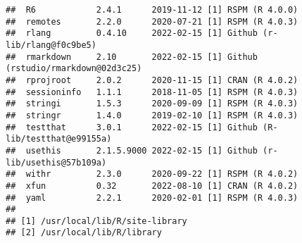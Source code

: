 \documentclass[
]{book}
\begin{document}
\begin{verbatim}
##  R6            2.4.1      2019-11-12 [1] RSPM (R 4.0.0)                    
##  remotes       2.2.0      2020-07-21 [1] RSPM (R 4.0.3)                    
##  rlang         0.4.10     2022-02-15 [1] Github (r-lib/rlang@f0c9be5)      
##  rmarkdown     2.10       2022-02-15 [1] Github (rstudio/rmarkdown@02d3c25)
##  rprojroot     2.0.2      2020-11-15 [1] CRAN (R 4.0.2)                    
##  sessioninfo   1.1.1      2018-11-05 [1] RSPM (R 4.0.3)                    
##  stringi       1.5.3      2020-09-09 [1] RSPM (R 4.0.3)                    
##  stringr       1.4.0      2019-02-10 [1] RSPM (R 4.0.3)                    
##  testthat      3.0.1      2022-02-15 [1] Github (R-lib/testthat@e99155a)   
##  usethis       2.1.5.9000 2022-02-15 [1] Github (r-lib/usethis@57b109a)    
##  withr         2.3.0      2020-09-22 [1] RSPM (R 4.0.2)                    
##  xfun          0.32       2022-08-10 [1] CRAN (R 4.0.2)                    
##  yaml          2.2.1      2020-02-01 [1] RSPM (R 4.0.3)                    
## 
## [1] /usr/local/lib/R/site-library
## [2] /usr/local/lib/R/library
\end{verbatim}
\end{document}
